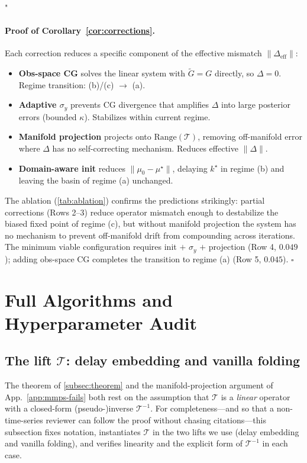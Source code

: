 "\documentclass{article}
\theoremstyle{plain}
\theoremstyle{definition}
\theoremstyle{remark}
\newcommand{\tsimg}{\mathcal{T}}
\newcommand{\imgts}{\mathcal{T}^{-1}}
\begin{document}
\paragraph{Proof of Corollary~\ref{cor:corrections}.}
Each correction reduces a specific component of the effective mismatch $\|\Delta_{\mathrm{eff}}\|$:
\begin{itemize}
\setlength{\itemsep}{0pt}
\item \textbf{Obs-space CG} solves the linear system with $\tilde{G} = G$ directly, so $\Delta = 0$. Regime transition: (b)/(c) $\to$ (a).
\item \textbf{Adaptive $\sigma_y$} prevents CG divergence that amplifies $\Delta$ into large posterior errors (bounded $\kappa$). Stabilizes within current regime.
\item \textbf{Manifold projection} projects onto $\mathrm{Range}(\tsimg)$, removing off-manifold error where $\Delta$ has no self-correcting mechanism. Reduces effective $\|\Delta\|$.
\item \textbf{Domain-aware init} reduces $\|\mu_0 - \mu^\star\|$, delaying $k^\star$ in regime (b) and leaving the basin of regime (a) unchanged.
\end{itemize}
The ablation (\cref{tab:ablation}) confirms the predictions strikingly: partial corrections (Rows 2--3) reduce operator mismatch enough to destabilize the biased fixed point of regime (c), but without manifold projection the system has no mechanism to prevent off-manifold drift from compounding across iterations. The minimum viable configuration requires init $+$ $\sigma_y$ $+$ projection (Row 4, $0.049$); adding obs-space CG completes the transition to regime (a) (Row 5, $0.045$). $\square$

\section{Full Algorithms and Hyperparameter Audit}
\label{app:algorithms}

\subsection{The lift $\tsimg$: delay embedding and vanilla folding}
\label{app:lift}

The theorem of \cref{subsec:theorem} and the manifold-projection argument of App.~\ref{app:mmps-fails} both rest on the assumption that $\tsimg$ is a \emph{linear} operator with a closed-form (pseudo-)inverse $\imgts$. For completeness---and so that a non-time-series reviewer can follow the proof without chasing citations---this subsection fixes notation, instantiates $\tsimg$ in the two lifts we use (delay embedding and vanilla folding), and verifies linearity and the explicit form of $\imgts$ in each case.
\end{document}
